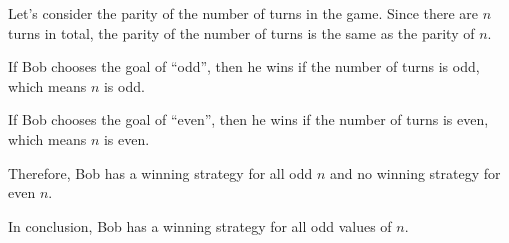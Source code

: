 Let's consider the parity of the number of turns in the game. Since there are $n$ turns in total, the parity of the number of turns is the same as the parity of $n$. 

If Bob chooses the goal of ``odd'', then he wins if the number of turns is odd, which means $n$ is odd.

If Bob chooses the goal of ``even'', then he wins if the number of turns is even, which means $n$ is even.

Therefore, Bob has a winning strategy for all odd $n$ and no winning strategy for even $n$. 

In conclusion, Bob has a winning strategy for all odd values of $n$.
